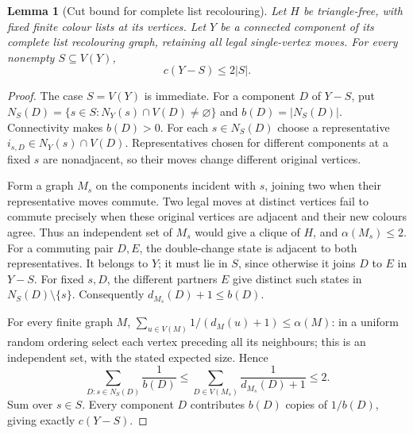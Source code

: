 \documentclass[11pt]{article}
\newtheorem{lemma}{Lemma}
\theoremstyle{remark}\newtheorem{remark}[lemma]{Remark}
\begin{document}
\begin{lemma}[Cut bound for complete list recolouring]\label{lem:cut}
Let $H$ be triangle-free, with fixed finite colour lists at its
vertices. Let $Y$ be a connected component of its complete list
recolouring graph, retaining all legal single-vertex moves. For
every nonempty $S\subseteq V(Y)$,
\[
                         c(Y-S)\le2|S|.
\]
\end{lemma}
\begin{proof}
The case $S=V(Y)$ is immediate. For a component $D$ of $Y-S$, put
$N_S(D)=\{s\in S:N_Y(s)\cap V(D)\ne\varnothing\}$ and
$b(D)=|N_S(D)|$. Connectivity makes $b(D)>0$.
For each $s\in N_S(D)$ choose a representative
$i_{s,D}\in N_Y(s)\cap V(D)$. Representatives chosen for different
components at a fixed $s$ are nonadjacent, so their moves change
different original vertices.

Form a graph $M_s$ on the components incident with $s$, joining two
when their representative moves commute. Two legal moves at distinct
vertices fail to commute precisely when these original vertices are
adjacent and their new colours agree. Thus an independent set of
$M_s$ would give a clique of $H$, and $\alpha(M_s)\le2$.
For a commuting pair $D,E$, the double-change state is adjacent to
both representatives. It belongs to $Y$; it must lie in $S$, since
otherwise it joins $D$ to $E$ in $Y-S$. For fixed $s,D$, the different
partners $E$ give distinct such states in $N_S(D)\setminus\{s\}$.
Consequently $d_{M_s}(D)+1\le b(D)$.

For every finite graph $M$,
$\sum_{u\in V(M)}1/(d_M(u)+1)\le\alpha(M)$: in a uniform random
ordering select each vertex preceding all its neighbours; this is an
independent set, with the stated expected size. Hence
\[
 \sum_{D:s\in N_S(D)}\frac1{b(D)}
 \le\sum_{D\in V(M_s)}\frac1{d_{M_s}(D)+1}\le2.
\]
Sum over $s\in S$. Every component $D$ contributes $b(D)$ copies of
$1/b(D)$, giving exactly $c(Y-S)$.
\end{proof}
\end{document}
